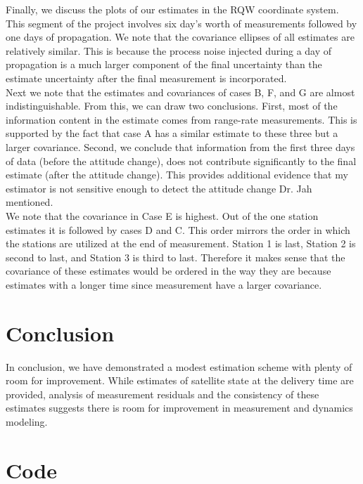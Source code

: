 \documentclass[11pt]{article}
\begin{document}
Finally, we discuss the plots of our estimates in the RQW coordinate system. This segment of the project involves six day's worth of measurements followed by one days of propagation. We note that the covariance ellipses of all estimates are relatively similar. This is because the process noise injected during a day of propagation is a much larger component of the final uncertainty than the estimate uncertainty after the final measurement is incorporated. \\

Next we note that the estimates and covariances of cases B, F, and G are almost indistinguishable. From this, we can draw two conclusions. First, most of the information content in the estimate comes from range-rate measurements. This is supported by the fact that case A has a similar estimate to these three but a larger covariance. Second, we conclude that information from the first three days of data (before the attitude change), does not contribute significantly to the final estimate (after the attitude change). This provides additional evidence that my estimator is not sensitive enough to detect the attitude change Dr. Jah mentioned. \\

We note that the covariance in Case E is highest. Out of the one station estimates it is followed by cases D and C. This order mirrors the order in which the stations are utilized at the end of measurement. Station 1 is last, Station 2 is second to last, and Station 3 is third to last. Therefore it makes sense that the covariance of these estimates would be ordered in the way they are because estimates with a longer time since measurement have a larger covariance. 

\section{Conclusion}

In conclusion, we have demonstrated a modest estimation scheme with plenty of room for improvement. While estimates of satellite state at the delivery time are provided, analysis of measurement residuals and the consistency of these estimates suggests there is room for improvement in measurement and dynamics modeling. \\

\newpage
\appendix
\section{Code}
\end{document}
